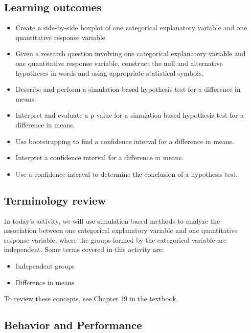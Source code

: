 \documentclass[
]{report}
\begin{document}

\subsection{Learning outcomes}\label{learning-outcomes-27}

\begin{itemize}
\item
  Create a side-by-side boxplot of one categorical explanatory variable and one quantitative response variable
\item
  Given a research question involving one categorical explanatory variable and one quantitative response variable, construct the null and alternative hypotheses
  in words and using appropriate statistical symbols.
\item
  Describe and perform a simulation-based hypothesis test for a difference in means.
\item
  Interpret and evaluate a p-value for a simulation-based hypothesis test for a difference in means.
\item
  Use bootstrapping to find a confidence interval for a difference in means.
\item
  Interpret a confidence interval for a difference in means.
\item
  Use a confidence interval to determine the conclusion of a hypothesis test.
\end{itemize}

\subsection{Terminology review}\label{terminology-review-21}

In today's activity, we will use simulation-based methods to analyze the association between one categorical explanatory variable and one quantitative response variable, where the groups formed by the categorical variable are independent. Some terms covered in this activity are:

\begin{itemize}
\item
  Independent groups
\item
  Difference in means
\end{itemize}

To review these concepts, see Chapter 19 in the textbook.

\subsection{Behavior and Performance}\label{behavior-and-performance}
\end{document}
